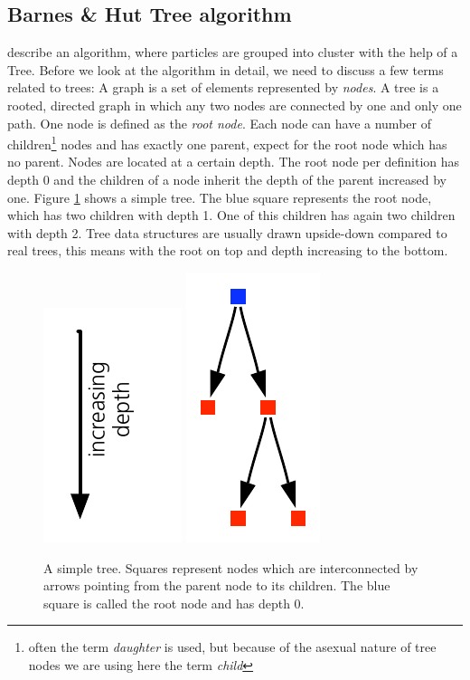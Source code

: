 \subsection{Barnes \& Hut Tree algorithm}
\cite{Barnes:1986p2853} describe an algorithm, where particles are grouped into cluster with the help of a Tree. Before we look at the algorithm in detail, we need to discuss a few terms related to trees: A graph is a set of elements represented by \emph{nodes}. A tree is a rooted, directed graph in which any two nodes are connected by one and only one path. One node is defined as the \emph{root node}. Each node can have a number of children\footnote{often the term \emph{daughter} is used, but because of the asexual nature of tree nodes we are using here the term \emph{child}} nodes and has exactly one parent, expect for the root node which has no parent. Nodes are located at a certain depth. The root node per definition has depth $0$ and the children of a node inherit the depth of the parent increased by one. Figure \ref{ch02_fig08} shows a simple tree. The blue square represents the root node, which has two children with depth 1. One of this children has again two children with depth 2. Tree data structures are usually drawn upside-down compared to real trees, this means with the root on top and depth increasing to the bottom.
\begin{figure}[htbp]
\begin{center}
\includegraphics[scale=1.0]{10tree_depth.pdf}
\includegraphics{08simpletree.pdf}
\caption{A simple tree. Squares represent nodes which are interconnected by arrows pointing from the parent node to its children. The blue square is called the root node and has depth $0$.}
\label{ch02_fig08}
\end{center}
\end{figure}
